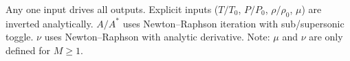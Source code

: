 \noindent Any one input drives all outputs. Explicit inputs ($T/T_0$, $P/P_0$, $\rho/\rho_0$, $\mu$) are inverted analytically. $A/A^*$ uses Newton--Raphson iteration with sub/supersonic toggle. $\nu$ uses Newton--Raphson with analytic derivative. Note: $\mu$ and $\nu$ are only defined for $M\ge1$.

